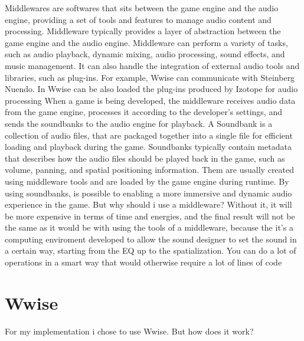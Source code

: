 Middlewares are softwares that sits between the game engine and the audio engine, providing a set of tools and features to manage audio content and processing. Middleware typically provides a layer of abstraction between the game engine and the audio engine.
Middleware can perform a variety of tasks, such as audio playback, dynamic mixing, audio processing, sound effects, and music management. It can also handle the integration of external audio tools and libraries, such as plug-ins. For example, Wwise can communicate with Steinberg Nuendo. In Wwise can be also loaded the plug-ins produced by Izotope for audio processing
When a game is being developed, the middleware receives audio data from the game engine, processes it according to the developer's settings, and sends the soundbanks to the audio engine for playback.
A Soundbank is a collection of audio files, that are packaged together into a single file for efficient loading and playback during the game.
Soundbanks typically contain metadata that describes how the audio files should be played back in the game, such as volume, panning, and spatial positioning information. Them are usually created using middleware tools and are loaded by the game engine during runtime. By using soundbanks, is possible to enabling a more immersive and dynamic audio experience in the game.
But why should i use a middleware? Without it, it will be more expensive in terms of time and energies, and the final result will not be the same as it would be with using the tools of a middleware, because the it's a computing enviroment developed to allow the sound designer to set the sound in a certain way, starting from the EQ up to the spatialization. You can do a lot of operations in a smart way that would otherwise require a lot of lines of code

\section{Wwise}
For my implementation i chose to use Wwise. But how does it work?
	
